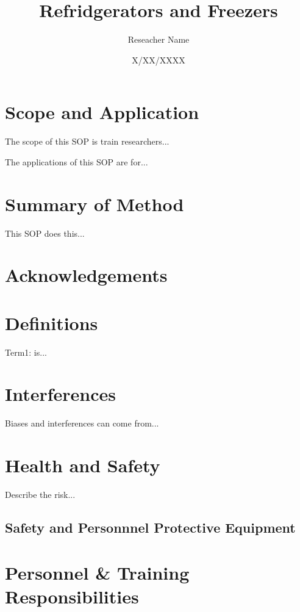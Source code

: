 \documentclass[12pt]{../SOP3_alpha}
\title{Refridgerators and Freezers}
\date{X/XX/XXXX}
\author{Reseacher Name}
\begin{document}


\maketitle

\section{Scope and Application}

\NP The scope of this SOP is train researchers...

\NP The applications of this SOP are for...

\section{Summary of Method}

\NP This SOP does this...

\tableofcontents

\newpage

\section{Acknowledgements}

\section{Definitions}

\NP Term1: is...

\section{Interferences}

\NP Biases and interferences can come from...

\section{Health and Safety}

\NP Describe the risk...


\subsection*{Safety and Personnnel Protective Equipment}


\section{Personnel \& Training Responsibilities}
\end{document}
